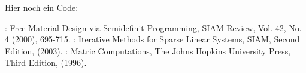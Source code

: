 

Hier noch ein Code: 




\begin{thebibliography}{2}
: Free Material Design via Semidefinit
Programming, SIAM Review, Vol. 42, No. 4 (2000), 695-715.
 : Iterative Methods for Sparse Linear Systems, SIAM, Second Edition, (2003).
 : Matric Computations, The Johns Hopkins University Press, Third Edition, (1996).
\end{thebibliography}